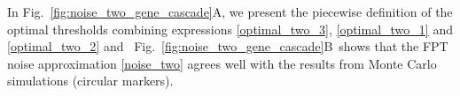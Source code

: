 \documentclass[aps,prb,reprint,superscriptaddress]{revtex4-2}
\begin{document}
In Fig.~\ref{fig:noise_two_gene_cascade}A, we present the piecewise definition of the optimal thresholds combining expressions \eqref{optimal_two_3}, \eqref{optimal_two_1} and \eqref{optimal_two_2} and ~Fig.~\ref{fig:noise_two_gene_cascade}B~shows that the FPT noise approximation \eqref{noise_two} agrees well with the results from Monte Carlo simulations (circular markers).

\end{document}
